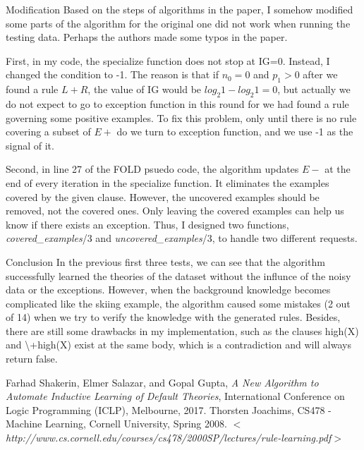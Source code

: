 \documentclass[12pt,a4paper]{article}
\begin{document}
	\begin{section}{Modification}
		Based on the steps of algorithms in the paper, I somehow modified some parts of the algorithm for the original one did not work when running the testing data. Perhaps the authors made some typos in the paper.

		First, in my code, the specialize function does not stop at IG=0. Instead, I changed the condition to -1. The reason is that if $n_0=0$ and $p_1 > 0$ after we found a rule $L+R$, the value of IG would be $log_2{1}-log_2{1}=0$, but actually we do not expect to go to exception function in this round for we had found a rule governing some positive examples. To fix this problem, only until there is no rule covering a subset of $E+$ do we turn to exception function, and we use -1 as the signal of it.

		Second, in line 27 of the FOLD psuedo code, the algorithm updates $E-$ at the end of every iteration in the specialize function. It eliminates the examples covered by the given clause. However, the uncovered examples should be removed, not the covered ones. Only leaving the covered examples can help us know if there exists an exception. Thus, I designed two functions, \emph{covered\_examples}/3 and \emph{uncovered\_examples}/3, to handle two different requests.

	\end{section}
	\begin{section}{Conclusion}
		In the previous first three tests, we can see that the algorithm successfully learned the theories of the dataset without the influnce of the noisy data or the exceptions. However, when the background knowledge becomes complicated like the skiing example, the algorithm caused some mistakes (2 out of 14) when we try to verify the knowledge with the generated rules. Besides, there are still some drawbacks in my implementation, such as the clauses high(X) and \textbackslash{+high(X)} exist at the same body, which is a contradiction and will always return false.
	\end{section}

	\begin{thebibliography}{unsrt}
		 Farhad Shakerin, Elmer Salazar, and Gopal Gupta, \textit{A New Algorithm to Automate Inductive Learning of Default Theories}, International Conference on Logic Programming (ICLP), Melbourne, 2017.
		 Thorsten Joachims, CS478 - Machine Learning, Cornell University, Spring 2008. \textit{$<$http://www.cs.cornell.edu/courses/cs478/2000SP/lectures/rule-learning.pdf$>$}
	\end{thebibliography}
\end{document}
